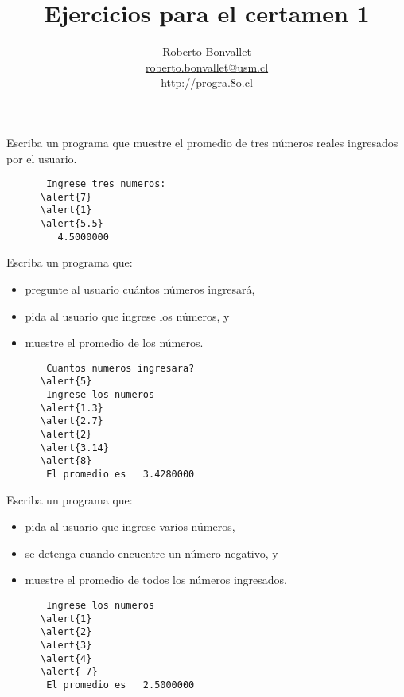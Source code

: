\documentclass[10pt]{beamer}
\title{Ejercicios para el certamen 1}
\author{
  Roberto Bonvallet \\
  \url{roberto.bonvallet@usm.cl} \\
  \url{http://progra.8o.cl}
}
\begin{document}
  \begin{frame}
    \maketitle 
  \end{frame}

  \begin{frame}[fragile]
    Escriba un programa
    que muestre el promedio de tres números reales
    ingresados por el usuario.

    \begin{Verbatim}
       Ingrese tres numeros:
      \alert{7}
      \alert{1}
      \alert{5.5}
         4.5000000    
    \end{Verbatim}

\end{frame}

  \begin{frame}
    
  \end{frame}

  \begin{frame}[fragile]
    Escriba un programa que:
    \begin{itemize}
      \item pregunte al usuario cuántos números ingresará,
      \item pida al usuario que ingrese los números, y
      \item muestre el promedio de los números.
    \end{itemize}

    \begin{Verbatim}
       Cuantos numeros ingresara?
      \alert{5}
       Ingrese los numeros
      \alert{1.3}
      \alert{2.7}
      \alert{2}
      \alert{3.14}
      \alert{8}
       El promedio es   3.4280000    
    \end{Verbatim}

\end{frame}

  \begin{frame}
    
  \end{frame}

  \begin{frame}[fragile]
    Escriba un programa que:
    \begin{itemize}
      \item pida al usuario que ingrese varios números,
      \item se detenga cuando encuentre un número negativo, y
      \item muestre el promedio de todos los números ingresados.
    \end{itemize}

    \begin{Verbatim}
       Ingrese los numeros
      \alert{1}
      \alert{2}
      \alert{3}
      \alert{4}
      \alert{-7}
       El promedio es   2.5000000
    \end{Verbatim}

\end{frame}
\end{document}
